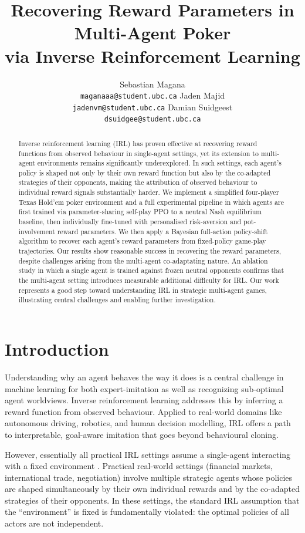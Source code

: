 \documentclass{article}
\title{Recovering Reward Parameters in Multi-Agent Poker\\via Inverse Reinforcement Learning}
\author{%
  Sebastian Magana\\
  \texttt{maganaaa@student.ubc.ca}
  \And
  Jaden Majid\\
  \texttt{jadenvm@student.ubc.ca}
  \And
  Damian Suidgeest\\
  \texttt{dsuidgee@student.ubc.ca}
}
\begin{document}
\maketitle

\begin{abstract}
Inverse reinforcement learning (IRL) has proven effective at recovering reward functions from observed behaviour in single-agent settings, yet its extension to multi-agent environments remains significantly underexplored. In such settings, each agent's policy is shaped not only by their own reward function but also by the co-adapted strategies of their opponents, making the attribution of observed behaviour to individual reward signals substantially harder. We implement a simplified four-player Texas Hold'em poker environment and a full experimental pipeline in which agents are first trained via parameter-sharing self-play PPO to a neutral Nash equilibrium baseline, then individually fine-tuned with personalised risk-aversion and pot-involvement reward parameters. We then apply a Bayesian full-action policy-shift algorithm to recover each agent's reward parameters from fixed-policy game-play trajectories. Our results show reasonable success in recovering the reward parameters, despite challenges arising from the multi-agent co-adaptating nature. An ablation study in which a single agent is trained against frozen neutral opponents confirms that the multi-agent setting introduces measurable additional difficulty for IRL. Our work represents a good step toward understanding IRL in strategic multi-agent games, illustrating central challenges and enabling further investigation.
\end{abstract}

\section{Introduction}

Understanding why an agent behaves the way it does is a central challenge in machine learning for both expert-imitation as well as recognizing sub-optimal agent worldviews. Inverse reinforcement learning \citep{ng2000algorithms} addresses this by inferring a reward function from observed behaviour. Applied to real-world domains like autonomous driving, robotics, and human decision modelling, IRL offers a path to interpretable, goal-aware imitation that goes beyond behavioural cloning.

However, essentially all practical IRL settings assume a single-agent interacting with a fixed environment \citep{ziebart2008maximum, zeng2022maximum, wei2024bayesian}. Practical real-world settings (financial markets, international trade, negotiation) involve multiple strategic agents whose policies are shaped simultaneously by their own individual rewards and by the co-adapted strategies of their opponents. In these settings, the standard IRL assumption that the ``environment'' is fixed is fundamentally violated: the optimal policies of all actors are not independent.
\end{document}

